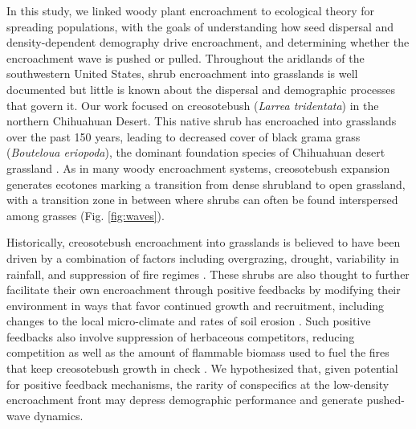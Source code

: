 \documentclass[11pt]{article}\usepackage[]{graphicx}\usepackage[]{color}
\begin{document}
In this study, we linked woody plant encroachment to ecological theory for spreading populations, with the goals of understanding how seed dispersal and density-dependent demography drive encroachment, and determining whether the encroachment wave is pushed or pulled.
Throughout the aridlands of the southwestern United States, shrub encroachment into grasslands is well documented \citep{d2012synthetic} but little is known about the dispersal and demographic processes that govern it. 
Our work focused on creosotebush (\textit{Larrea tridentata}) in the northern Chihuahuan Desert. 
This native shrub has encroached into grasslands over the past 150 years, leading to decreased cover of black grama grass (\textit{Bouteloua eriopoda}), the dominant foundation species of Chihuahuan desert grassland \citep{gardner1951vegetation, buffington1965vegetational, gibbens2005vegetation}.
As in many woody encroachment systems, creosotebush expansion generates ecotones marking a transition from dense shrubland to open grassland, with a transition zone in between where shrubs can often be found interspersed among grasses (Fig. \ref{fig:waves}).

Historically, creosotebush encroachment into grasslands is believed to have been driven by a combination of factors including overgrazing, drought, variability in rainfall, and suppression of fire regimes \citep{moreno2016seed}.
These shrubs are also thought to further facilitate their own encroachment through positive feedbacks \citep{grover1990shrubland, d2012synthetic} by modifying their environment in ways that favor continued growth and recruitment, including changes to the local micro-climate \citep{d2010positive} and rates of soil erosion \citep{turnbull2010changes}.
Such positive feedbacks also involve suppression of herbaceous competitors, reducing competition as well as the amount of flammable biomass used to fuel the fires that keep creosotebush growth in check \citep{van2000shrub}.
We hypothesized that, given potential for positive feedback mechanisms, the rarity of conspecifics at the low-density encroachment front may depress demographic performance and generate pushed-wave dynamics.

\end{document}
